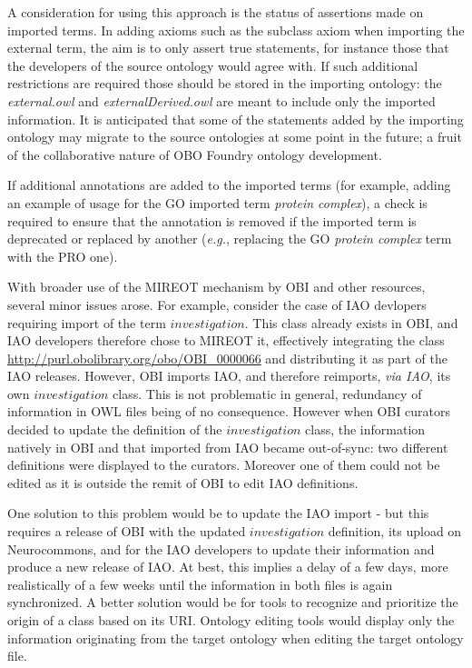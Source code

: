 \documentclass{ao2e}%
\begin{document}
A consideration for using this approach is the status of assertions made on imported terms.
In adding axioms such as the subclass axiom when importing the external term, the aim is to only assert true statements, for instance those that the developers of the source ontology would agree with.
If such additional restrictions are required those should be stored in the importing ontology: the \emph{external.owl} and \emph{externalDerived.owl} are meant to include only the imported information.
It is anticipated that some of the statements added by the importing ontology may migrate to the source ontologies at some point in the future; a fruit of the collaborative nature of OBO Foundry ontology development. %

If additional annotations are added to the imported terms (for example, adding an example of usage for the \ac{GO} imported term \textit{protein complex}), a check is required to ensure that the annotation is removed if the imported term is deprecated or replaced by another (\emph{e.g.}, replacing  the \ac{GO} \textit{protein complex} term with the \ac{PRO} \cite{PRO} one).

With broader use of the MIREOT mechanism by OBI and other resources, several minor issues arose.
For example, consider the case of \ac{IAO} devlopers requiring import of the term $investigation$.  This class already exists in \ac{OBI}, and \ac{IAO} developers therefore chose to MIREOT it, effectively integrating the class \url{http://purl.obolibrary.org/obo/OBI_0000066} and distributing it as part of the \ac{IAO} releases.
However, \ac{OBI} imports \ac{IAO}, and therefore reimports, \emph{via IAO}, its own $investigation$ class. This is not problematic in general, redundancy of information in OWL files being of no consequence. However when \ac{OBI} curators decided to update the definition of the $investigation$ class, the information natively in \ac{OBI} and that imported from \ac{IAO} became out-of-sync: two different definitions were displayed to the curators. Moreover one of them could not be edited as it is outside the remit of OBI to edit IAO definitions.

One solution to this problem would be to update the \ac{IAO} import - but this requires a release of \ac{OBI} with the updated $investigation$ definition, its upload on Neurocommons, and for the \ac{IAO} developers to update their information and produce a new release of \ac{IAO}. At best, this implies a delay of a few days, more realistically of a few weeks until the information in both files is again synchronized.
A better solution would be for tools to recognize and prioritize the origin of a class based on its URI. Ontology editing tools would display only the information originating from the target ontology when editing the target ontology file.
\end{document}
